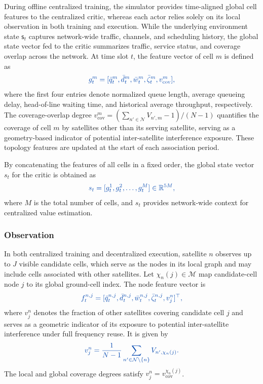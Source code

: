 \documentclass[journal]{IEEEtran}
\newcommand{\revbegin}[1]{\color{revisionblue}\ignorespaces}
\newcommand{\revend}[1]{\color{black}\ignorespaces}
\begin{document}
\revbegin{}During offline centralized training, the simulator provides time-aligned global cell features to the centralized critic, whereas each actor relies solely on its local observation in both training and execution. While the underlying environment state $\mathsf{s}_t$ captures network-wide traffic, channels, and scheduling history, the global state vector fed to the critic summarizes traffic, service status, and coverage overlap across the network. At time slot $t$, the feature vector of cell $m$ is defined as\revend{}
\begin{equation}\color{revisionblue}
g_t^m=[\bar q_t^m,\bar d_t^m,\bar w_t^m,\bar\zeta_t^m,v_{\mathrm{cov}}^m],
\end{equation}
\revbegin{}where the first four entries denote normalized queue length, average queueing delay, head-of-line waiting time, and historical average throughput, respectively. The coverage-overlap degree $v_{\mathrm{cov}}^m=(\sum_{n'\in\mathcal N}V_{n',m}-1)/(N-1)$ quantifies the coverage of cell $m$ by satellites other than its serving satellite, serving as a geometry-based indicator of potential inter-satellite interference exposure. These topology features are updated at the start of each association period.\revend{}

\revbegin{}By concatenating the features of all cells in a fixed order, the global state vector $s_t$ for the critic is obtained as\revend{}
\begin{equation}\color{revisionblue}
s_t=[g_t^1,g_t^2,\ldots,g_t^M]\in\mathbb{R}^{5M},
\end{equation}
\revbegin{}where $M$ is the total number of cells, and $s_t$ provides network-wide context for centralized value estimation.\revend{}

\subsubsection{Observation}

\revbegin{}In both centralized training and decentralized execution, satellite $n$ observes up to $J$ visible candidate cells, which serve as the nodes in its local graph and may include cells associated with other satellites. Let $\chi_n(j)\in\mathcal M$ map candidate-cell node $j$ to its global ground-cell index. The node feature vector is\revend{}
\begin{equation}\color{revisionblue}
f_t^{n,j}=[\bar q_t^{n,j},\bar d_t^{n,j},\bar w_t^{n,j},\bar\zeta_t^{n,j},v_j^n]^\top,
\end{equation}
\revbegin{}where $v_j^n$ denotes the fraction of other satellites covering candidate cell $j$ and serves as a geometric indicator of its exposure to potential inter-satellite interference under full frequency reuse. It is given by\revend{}
\begin{equation}\color{revisionblue}
v_j^n=\frac{1}{N-1}\sum_{n'\in\mathcal N\setminus\{n\}}V_{n',\chi_n(j)}.
\label{eq:coverage-degree}
\end{equation}
\revbegin{}The local and global coverage degrees satisfy $v_j^n=v_{\mathrm{cov}}^{\chi_n(j)}$.\revend{}
\end{document}
